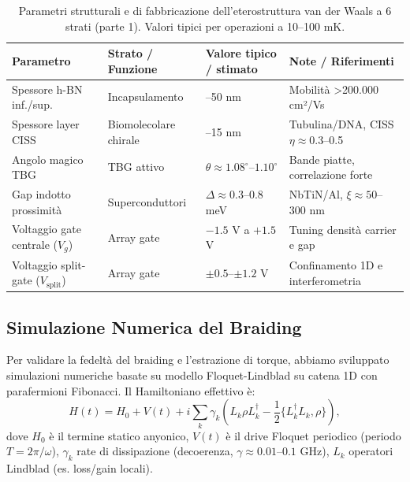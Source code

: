 \documentclass[11pt,a4paper]{article}
\let\oldcite\cite
\renewcommand{\cite}{\protect\oldcite}
\theoremstyle{plain}
\theoremstyle{definition}
\begin{document}
\begin{table}[H]
\centering
\small
\caption{Parametri strutturali e di fabbricazione dell'eterostruttura van der Waals a 6 strati (parte 1). Valori tipici per operazioni a 10--100 mK.}
\label{tab:device-parameters-struct}

\setlength{\tabcolsep}{4pt}  %
\begin{tabularx}{\textwidth}{@{} 
  >{\RaggedRight\arraybackslash}X 
  >{\RaggedRight\arraybackslash}l 
  >{\centering\arraybackslash}X 
  >{\RaggedRight\arraybackslash}X 
  @{}}

\toprule
\textbf{Parametro} & \textbf{Strato / Funzione} & \textbf{Valore tipico / stimato} & \textbf{Note / Riferimenti} \\
\midrule
Spessore h-BN inf./sup. & Incapsulamento & 10--50 nm & Mobilità >200.000 cm²/Vs \cite{cao2018unconventional} \\
Spessore layer CISS & Biomolecolare chirale & 5--15 nm & Tubulina/DNA, CISS $\eta \approx 0.3$--0.5 \cite{naaman2019spin, kumar2026ciss} \\
Angolo magico TBG & TBG attivo & $\theta \approx 1.08^\circ$--$1.10^\circ$ & Bande piatte, correlazione forte \cite{yankowitz2019tuning} \\
Gap indotto prossimità & Superconduttori & $\Delta \approx 0.3$--$0.8$ meV & NbTiN/Al, $\xi \approx 50$--$300$ nm \cite{mourik2012signatures, he2021impurity} \\
Voltaggio gate centrale ($V_g$) & Array gate & $-1.5$ V a $+1.5$ V & Tuning densità carrier e gap \\
Voltaggio split-gate ($V_{\text{split}}$) & Array gate & $\pm 0.5$--$\pm 1.2$ V & Confinamento 1D e interferometria \\
\bottomrule
\end{tabularx}
\end{table}



\vspace{0.5cm}

\subsection{Simulazione Numerica del Braiding}

Per validare la fedeltà del braiding e l'estrazione di torque, abbiamo sviluppato simulazioni numeriche basate su modello Floquet-Lindblad su catena 1D con parafermioni Fibonacci. Il Hamiltoniano effettivo è:
\begin{equation}
H(t) = H_0 + V(t) + i \sum_k \gamma_k (L_k \rho L_k^\dagger - \frac{1}{2} \{L_k^\dagger L_k, \rho\}),
\label{eq:floquet_lindblad_hamiltonian}
\end{equation}
dove $H_0$ è il termine statico anyonico, $V(t)$ è il drive Floquet periodico (periodo $T = 2\pi / \omega$), $\gamma_k$ rate di dissipazione (decoerenza, $\gamma \approx 0.01$--$0.1$ GHz), $L_k$ operatori Lindblad (es. loss/gain locali).
\end{document}
